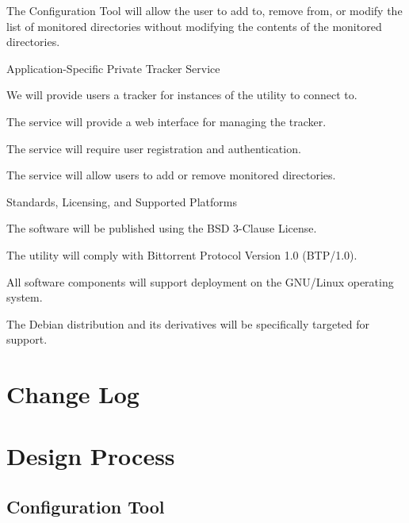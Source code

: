 \documentclass[12 pt]{article}
\begin{document}
\begin{enum}
\begin{enum}
\begin{enum}
				\item The Configuration Tool will allow the user to add to, remove from, or modify the list of monitored directories without modifying the contents of the monitored directories.
			\end{enum}
			\item Application-Specific Private Tracker Service
			\begin{enum}
				\item We will provide users a tracker for instances of the utility to connect to.
				\item The service will provide a web interface for managing the tracker.
				\item The service will require user registration and authentication.
				\item The service will allow users to add or remove monitored directories.
			\end{enum}
		\end{enum}
		\item Standards, Licensing, and Supported Platforms
		\begin{enum}
			\item The software will be published using the BSD 3-Clause License.
			\item The utility will comply with Bittorrent Protocol Version 1.0 (BTP/1.0).
			\item All software components will support deployment on the GNU/Linux operating system.
			\begin{enum}
				\item The Debian distribution and its derivatives will be specifically targeted for support.
			\end{enum}
		\end{enum}
	\end{enum}
	
	\section{Change Log}
	
	\section{Design Process}
	
	\subsection{Configuration Tool}
	
\end{document}
